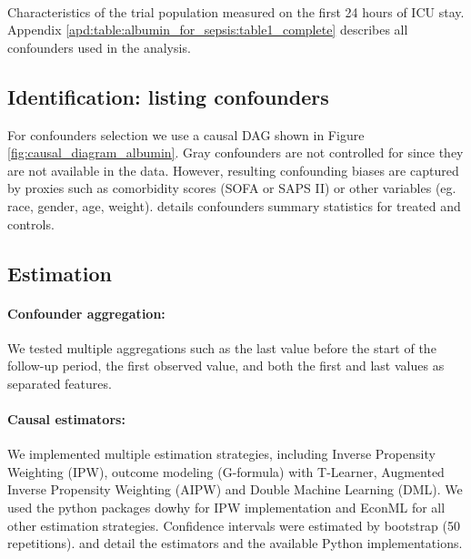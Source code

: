 \documentclass[10pt,letterpaper]{article}
\begin{document}
\begin{table}[h!]
  \centering\small
  \resizebox{\columnwidth}{!}{
  }
  \\[.5ex]

  \caption{Characteristics of the trial population measured on the first 24
    hours of ICU stay. Appendix \ref{apd:table:albumin_for_sepsis:table1_complete}
    describes all confounders used in the analysis.}\label{table:albumin_for_sepsis:table1_simple}
\end{table}


\subsection*{Identification: listing confounders}\label{sec:identification_mimic_iv}

For confounders selection we use a causal DAG shown in Figure
\ref{fig:causal_diagram_albumin}. Gray confounders are not controlled for since
they are not available in the data. However, resulting confounding biases are
captured by proxies such as comorbidity scores (SOFA or SAPS II) or other
variables (eg. race, gender, age, weight).
%
 details confounders
summary statistics for treated and controls.

\subsection*{Estimation}\label{sec:estimation_mimic_iv}


\paragraph{Confounder aggregation:}

We tested multiple aggregations such as the last value before the start of the
follow-up period, the first observed value, and both the first and last values as
separated features.

\paragraph{Causal estimators:}

We implemented multiple estimation strategies, including Inverse Propensity
Weighting (IPW), outcome modeling (G-formula) with T-Learner, Augmented Inverse
Propensity Weighting (AIPW) and Double Machine Learning (DML). We used the
python packages dowhy \cite{sharma2018tutorial} for IPW implementation and
EconML \cite{battocchi2019econml} for all other estimation strategies.
Confidence intervals were estimated by bootstrap (50 repetitions).
 and
 detail the estimators and the available Python
implementations.
\end{document}
